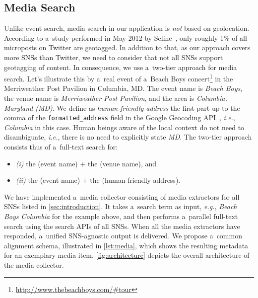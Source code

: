 \documentclass[runningheads,a4paper]{llncs}
\begin{document}
{\subsection{Media Search} \label{sec:media-search}
Unlike event search, media search in our application is \emph{not} based on geolocation. According to a~study performed in May 2012 by Seline~\cite{Quora2012},
only roughly 1\% of all microposts on Twitter are geotagged. In addition to that, as our approach covers more SNSs than Twitter, we need to consider that not all SNSs support geotagging of content. In consequence, we use a~two-tier approach for media search. Let's illustrate this by a~real event of a~Beach Boys concert\footnote{\url{http://www.thebeachboys.com/\#tour}} in the Merriweather Post Pavilion in Columbia, MD. The event name is \emph{Beach Boys},
the venue name is \emph{Merriweather Post Pavilion}, and the area is \emph{Columbia, Maryland (MD)}. We define as \emph{human-friendly address} the first part up to the comma of the \texttt{formatted\_address} field in the Google Geocoding API~\cite{Geocoding2012}, \emph{i.e.}, \emph{Columbia} in this case. Human beings aware of the local context do not need to disambiguate, \emph{i.e.}, there is no need to explicitly state \emph{MD}. The two-tier approach consists thus of a~full-text search for:
\begin{itemize}
 \item \emph{(i)} the (event name) $+$ the (venue name), and
 \item \emph{(ii)} the (event name) $+$ the (human-friendly address).
\end{itemize}

We have implemented a~media collector consisting of media extractors for all SNSs listed in \autoref{sec:introduction}.
It takes a~search term as input, \emph{e.g.}, \emph{Beach Boys Columbia} for the example above, and then performs a~parallel full-text search using the search APIs of all SNSs. When all the media extractors have responded, a~unified SNS-agnostic output is delivered. We propose a~common alignment schema, illustrated in
\autoref{lst:media}, which shows the resulting metadata for an exemplary media item.  \autoref{fig:architecture} depicts the overall architecture of the media collector.

}
\end{document}
